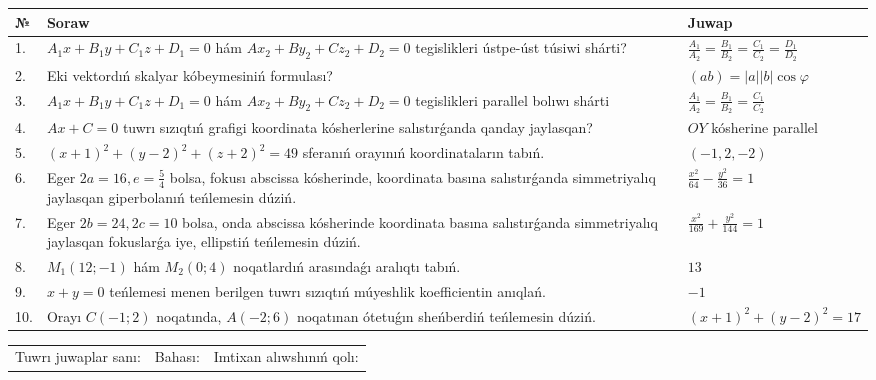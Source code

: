 \documentclass{article}
\begin{document}
\begin{tabular}{|m{0.7cm}|m{10cm}|m{4cm}|}
\hline
№ & Soraw & Juwap \\
\hline
1. & $A_1x+B_1y+C_1z+D_1=0$ hám $Ax_2+By_2+Cz_2+D_2=0$ tegislikleri ústpe-úst túsiwi shárti? & $\frac{A_1}{A_2}=\frac{B_1}{B_2}=\frac{C_1}{C_2}=\frac{D_1}{D_2}$ \\
\hline
2. & Eki vektordıń skalyar kóbeymesiniń formulası? & $(ab)=|a||b|\cos\varphi$ \\
\hline
3. & $A_1x+B_1y+C_1z+D_1=0$ hám $Ax_2+By_2+Cz_2+D_2=0$ tegislikleri parallel bolıwı shárti & $\frac{A_1}{A_2}=\frac{B_1}{B_2}=\frac{C_1}{C_2}$ \\
\hline
4. & $Ax+C=0$ tuwrı sızıqtıń grafigi koordinata kósherlerine salıstırǵanda qanday jaylasqan? & $OY$ kósherine parallel \\
\hline
5. & $(x+1)^{2}+(y-2) ^{2}+(z+2) ^{2}=49$ sferanıń orayınıń koordinataların tabıń. & $(-1,2,-2)$ \\
\hline
6. & Eger $2a=16, e=\frac{5}{4}$ bolsa, fokusı abscissa kósherinde, koordinata basına salıstırǵanda simmetriyalıq jaylasqan giperbolanıń teńlemesin dúziń. & $\frac{x^{2}}{64}-\frac{y^{2}}{36}=1$ \\
\hline
7. & Eger $2b=24, 2 c=10$ bolsa, onda abscissa kósherinde koordinata basına salıstırǵanda simmetriyalıq jaylasqan fokuslarǵa iye, ellipstiń teńlemesin dúziń. & $\frac{x^{2}}{169}+\frac{y^{2}}{144}=1$ \\
\hline
8. & $M_{1} (12;-1)$ hám $M_{2} (0;4)$ noqatlardıń arasındaǵı aralıqtı tabıń. & $13$ \\
\hline
9. & $x+y=0$ teńlemesi menen berilgen tuwrı sızıqtıń múyeshlik koefficientin anıqlań. & $- 1$ \\
\hline
10. & Orayı $C (-1;2)$ noqatında, $A (-2;6 )$ noqatınan ótetuǵın sheńberdiń teńlemesin dúziń. & $(x+1)^{2}+(y-2)^{2}=17$ \\
\hline
\end{tabular}

\vspace{1cm}

\begin{tabular}{lll}
Tuwrı juwaplar sanı: \underline{\hspace{1.5cm}} & 
Bahası: \underline{\hspace{1.5cm}} & 
Imtixan alıwshınıń qolı: \underline{\hspace{2cm}} \\
\end{tabular}

\egroup
\end{document}
